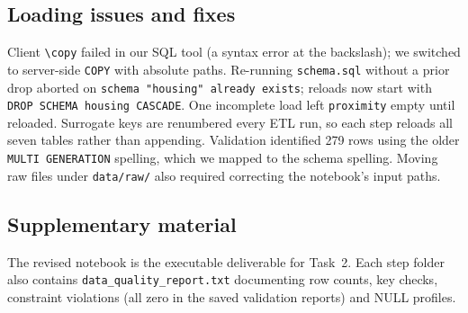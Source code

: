 \subsection{Loading issues and fixes}
Client \verb|\copy| failed in our SQL tool (a syntax error at the backslash); we switched to server-side \texttt{COPY} with absolute paths.
Re-running \texttt{schema.sql} without a prior drop aborted on \texttt{schema "housing" already exists}; reloads now start with \texttt{DROP SCHEMA housing CASCADE}.
One incomplete load left \texttt{proximity} empty until reloaded.
Surrogate keys are renumbered every ETL run, so each step reloads all seven tables rather than appending.
Validation identified 279 rows using the older \texttt{MULTI GENERATION} spelling, which we mapped to the schema spelling. Moving raw files under \texttt{data/raw/} also required correcting the notebook's input paths.

\subsection{Supplementary material}
The revised notebook is the executable deliverable for Task~2.
Each step folder also contains \texttt{data\_quality\_report.txt} documenting row counts, key checks, constraint violations (all zero in the saved validation reports) and NULL profiles.
